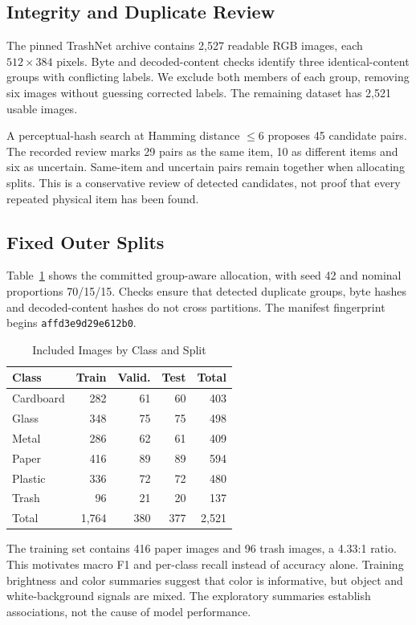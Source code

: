 \documentclass[conference]{IEEEtran}
\begin{document}
\subsection{Integrity and Duplicate Review}
The pinned TrashNet archive contains 2,527 readable RGB images, each $512\times384$ pixels. Byte and decoded-content checks identify three identical-content groups with conflicting labels. We exclude both members of each group, removing six images without guessing corrected labels. The remaining dataset has 2,521 usable images.

A perceptual-hash search at Hamming distance $\leq6$ proposes 45 candidate pairs. The recorded review marks 29 pairs as the same item, 10 as different items and six as uncertain. Same-item and uncertain pairs remain together when allocating splits. This is a conservative review of detected candidates, not proof that every repeated physical item has been found.

\subsection{Fixed Outer Splits}
Table~\ref{tab:split} shows the committed group-aware allocation, with seed 42 and nominal proportions 70/15/15. Checks ensure that detected duplicate groups, byte hashes and decoded-content hashes do not cross partitions. The manifest fingerprint begins \texttt{affd3e9d29e612b0}.

\begin{table}[t]
\caption{Included Images by Class and Split}
\label{tab:split}\centering
\begin{tabular}{lrrrr}\toprule
Class & Train & Valid. & Test & Total\\\midrule
Cardboard & 282 & 61 & 60 & 403 \\
Glass & 348 & 75 & 75 & 498 \\
Metal & 286 & 62 & 61 & 409 \\
Paper & 416 & 89 & 89 & 594 \\
Plastic & 336 & 72 & 72 & 480 \\
Trash & 96 & 21 & 20 & 137 \\
\midrule Total & 1,764 & 380 & 377 & 2,521\\\bottomrule
\end{tabular}
\end{table}

The training set contains 416 paper images and 96 trash images, a 4.33:1 ratio. This motivates macro F1 and per-class recall instead of accuracy alone. Training brightness and color summaries suggest that color is informative, but object and white-background signals are mixed. The exploratory summaries establish associations, not the cause of model performance.
\end{document}
